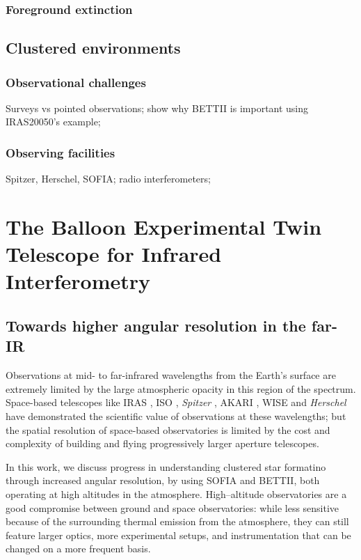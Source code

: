 \subsubsection{Foreground extinction}

\subsection{Clustered environments}

\subsubsection{Observational challenges}

Surveys vs pointed observations; show why BETTII is important using IRAS20050's example;

\subsubsection{Observing facilities}

Spitzer, Herschel, SOFIA; radio interferometers;

\section{The Balloon Experimental Twin Telescope for Infrared Interferometry}

\subsection{Towards higher angular resolution in the far-IR}
Observations at mid- to far-infrared wavelengths from the Earth's surface are extremely 
limited by the large atmospheric opacity in this region of the spectrum. Space-based telescopes 
like IRAS \cite[12-100 \um;][]{1984ApJ...278L...1N}, ISO \cite[2.5-240 $\um$;][]{1996A&A...315L..27K}, \textit{Spitzer} \cite[3.6-160 $\um$;][]{2004ApJS..154....1W}, AKARI  \cite[1.7-180 $\um$;][]{2007PASJ...59S.369M}, WISE \cite[3.4-22 $\um$;][]{2010AJ....140.1868W} and \textit{Herschel} \cite[55-672 $\um$;][]{2010A&A...518L...1P} have demonstrated the scientific value of observations at 
these wavelengths; but the spatial resolution of space-based observatories is limited by the cost 
and complexity of building and flying progressively larger aperture telescopes. 

In this work, we discuss progress in understanding clustered star formatino through increased angular resolution, by using SOFIA and BETTII, both operating at high altitudes in the atmosphere. High--altitude observatories are a good compromise between ground and space observatories: while less sensitive because of the surrounding thermal emission from the atmosphere, they can still feature larger optics, more experimental setups, and instrumentation that can be changed on a more frequent basis.

